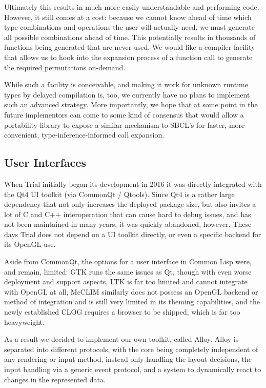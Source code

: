 \documentclass[format=sigconf]{acmart}
\begin{document}
Ultimately this results in much more easily understandable and performing code. However, it still comes at a cost: because we cannot know ahead of time which type combinations and operations the user will actually need, we must generate all possible combinations ahead of time. This potentially results in thousands of functions being generated that are never used. We would like a compiler facility that allows us to hook into the expansion process of a function call to generate the required permutations on-demand.

While such a facility is conceivable, and making it work for unknown runtime types by delayed compilation is, too, we currently have no plans to implement such an advanced strategy. More importantly, we hope that at some point in the future implementors can come to some kind of consensus that would allow a portability library to expose a similar mechanism to SBCL's  for faster, more convenient, type-inference-informed call expansion.

\subsection{User Interfaces}\label{ui}
When Trial initially began its development in 2016 it was directly integrated with the Qt4 UI toolkit (via CommonQt / Qtools). Since Qt4 is a rather large dependency that not only increases the deployed package size, but also invites a lot of C and C++ interoperation that can cause hard to debug issues, and has not been maintained in many years, it was quickly abandoned, however. These days Trial does not depend on a UI toolkit directly, or even a specific backend for its OpenGL use.

Aside from CommonQt, the options for a user interface in Common Lisp were, and remain, limited: GTK runs the same issues as Qt, though with even worse deployment and support aspects, LTK is far too limited and cannot integrate with OpenGL at all, McCLIM similarly does not possess an OpenGL backend or method of integration and is still very limited in its theming capabilities, and the newly established CLOG requires a browser to be shipped, which is far too heavyweight.

As a result we decided to implement our own toolkit, called Alloy. Alloy is separated into different protocols, with the core being completely independent of any rendering or input method, instead only handling the layout decisions, the input handling via a generic event protocol, and a system to dynamically react to changes in the represented data.
\end{document}
